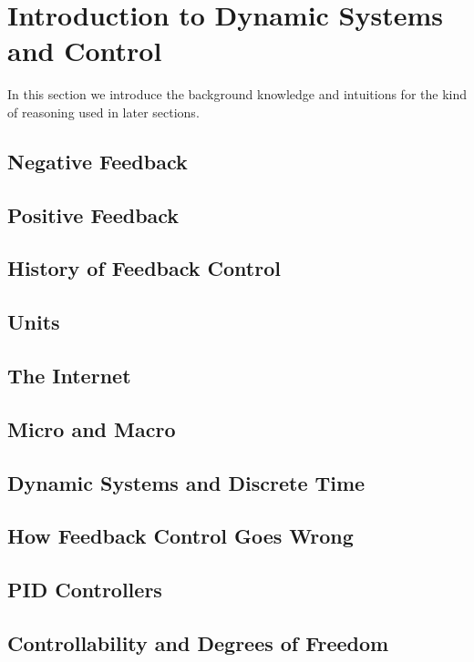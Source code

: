 \section{Introduction to Dynamic Systems and Control}
\label{sec:dynamic_systems_and_control}

In this section we introduce the background knowledge and intuitions for the kind of reasoning used
in later sections.

\subsection{Negative Feedback}

\subsection{Positive Feedback}

\subsection{History of Feedback Control} 

\subsection{Units}

\subsection{The Internet}

\subsection{Micro and Macro}

\subsection{Dynamic Systems and Discrete Time}

\subsection{How Feedback Control Goes Wrong}

\subsection{PID Controllers}

\subsection{Controllability and Degrees of Freedom}

